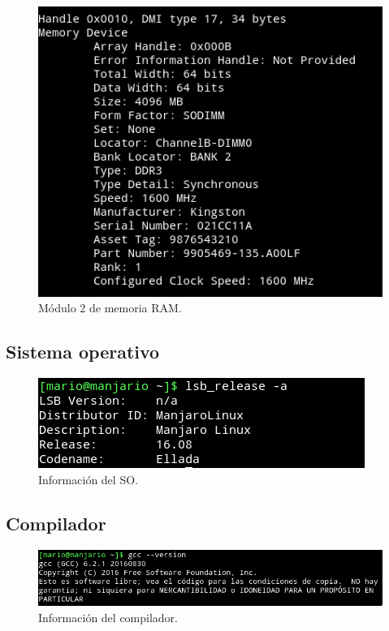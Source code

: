 \begin{figure}[H] %
\centering
\includegraphics[scale=0.7]{ejercicio0/mem2.png}  %
\caption{Módulo 2 de memoria RAM.} 
\label{fig:figura1.3}
\end{figure}

\subsection{Sistema operativo}
\begin{figure}[H] %
\centering
\includegraphics[scale=1]{ejercicio0/SO.png}  %
\caption{Información del SO.} 
\label{fig:figura1}
\end{figure}

\subsection{Compilador}
\begin{figure}[H] %
\centering
\includegraphics[scale=0.6]{ejercicio0/compilador.png}  %
\caption{Información del compilador.} 
\label{fig:figura2}
\end{figure}

